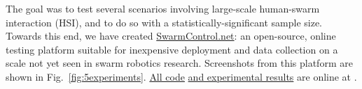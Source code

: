 {%

The goal was to test several scenarios involving large-scale human-swarm interaction (HSI), and to do so with a statistically-significant sample size. Towards this end, we have created \href{http://www.swarmcontrol.net/show_results}{SwarmControl.net}: an open-source, online testing platform suitable for inexpensive deployment and data collection on a scale not yet seen in swarm robotics research. Screenshots from this platform are shown in Fig.~\ref{fig:5experiments}.  \href{https://github.com/crertel/swarmmanipulate.git}{All code} \href{http://www.swarmcontrol.net/show_results}{and experimental results} are online at \cite{Chris-Ertel2016}.

}
